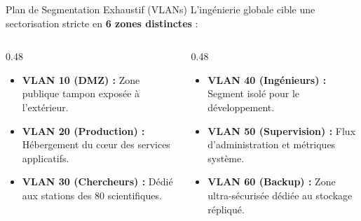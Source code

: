 \begin{frame}{Plan de Segmentation Exhaustif (VLANs)}
    L'ingénierie globale cible une sectorisation stricte en \textbf{6 zones distinctes} :
    
    \vspace{0.2cm}
    \begin{columns}[T]
        \begin{column}{0.48\textwidth}
            \begin{itemize}
                \item \textbf{VLAN 10 (DMZ) :} Zone publique tampon exposée à l'extérieur.
                \item \textbf{VLAN 20 (Production) :} Hébergement du cœur des services applicatifs.
                \item \textbf{VLAN 30 (Chercheurs) :} Dédié aux stations des 80 scientifiques.
            \end{itemize}
        \end{column}
        
        \begin{column}{0.48\textwidth}
            \begin{itemize}
                \item \textbf{VLAN 40 (Ingénieurs) :} Segment isolé pour le développement.
                \item \textbf{VLAN 50 (Supervision) :} Flux d'administration et métriques système.
                \item \textbf{VLAN 60 (Backup) :} Zone ultra-sécurisée dédiée au stockage répliqué.
            \end{itemize}
        \end{column}
    \end{columns}
\end{frame}

